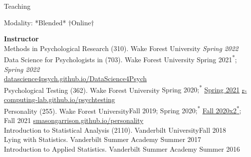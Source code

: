 \begin{rSection}{\textrm{Teaching}}
\vspace*{2pt}
\vspace{-1mm}\begin{center}\footnotesize{Modality: *Blended* $\dagger$Online$\dagger$}\end{center}\vspace{-4mm}
{\large  \bf Instructor}\\
Methods in Psychological Research (310). Wake Forest University \hfill {\textit{Spring 2022}}\smallskip\\
Data Science for Psychologists in \R (703). Wake Forest University   \hfill{Spring 2021\textsuperscript{*}; \textit{Spring 2022}}\\
\hspace* {6 mm}\href{https://datascience4psych.github.io/DataScience4Psych/}{\color{blue} datascience4psych.github.io/DataScience4Psych}\smallskip\\
Psychological Testing  (362). Wake Forest University \hfill{Spring 2020;\textsuperscript{*} \href{https://www.youtube.com/playlist?list=PLKrrdtYgOUYYgag4erySD7L0jDcZGMlS_}{\color{blue}Spring 2021\noteBns}}
\hspace* {6 mm} \href{https://r-computing-lab.github.io/psychtesting/}{\color{blue} r-computing-lab.github.io/psychtesting}\smallskip\\
Personality (255). Wake Forest University\hfill{Fall 2019; Spring 2020;\textsuperscript{*} \href{https://www.youtube.com/playlist?list=PLKrrdtYgOUYZpENpYddjG8n_q3bfbx8Kr}{\color{blue}Fall 2020x2\textsuperscript{*}\noteBns}; Fall 2021}
\hspace* {6 mm} \href{https://smasongarrison.github.io/personality/}{\color{blue} smasongarrison.github.io/personality}\smallskip\\
Introduction to Statistical Analysis (2110). Vanderbilt University\hfill {Fall 2018}\smallskip\\
Lying with Statistics. Vanderbilt Summer Academy \hfill{Summer 2017}\smallskip\\
Introduction to Applied Statistics. Vanderbilt Summer Academy \hfill{Summer 2016}%


\end{rSection}
